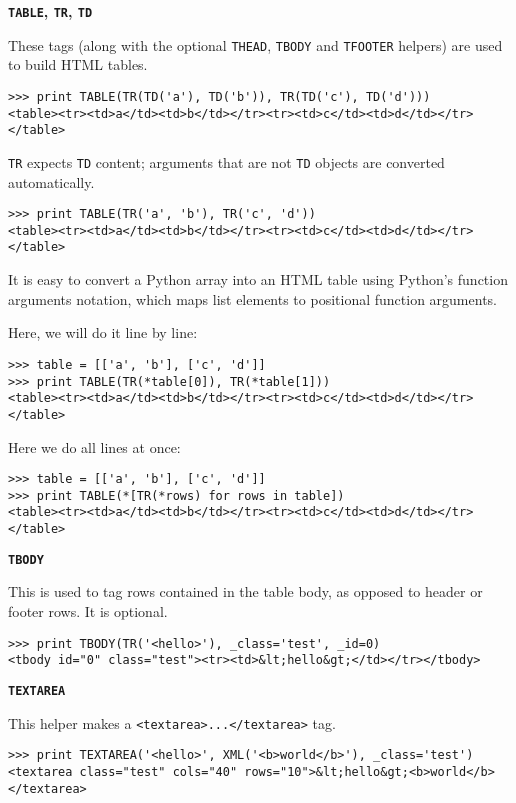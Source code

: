 \documentclass[justified,sixbynine,notoc]{tufte-book}
\def\ft{\small\tt}
\def\inxx#1{\index{#1}}
\begin{document}
\begin{fullwidth}
{\bf {\ft TABLE}, {\ft TR}, {\ft TD}}

\inxx{TABLE} \inxx{TR} \inxx{TD}

These tags (along with the optional {\ft THEAD}, {\ft TBODY} and {\ft TFOOTER} helpers) are used to build HTML tables.
\begin{lstlisting}
>>> print TABLE(TR(TD('a'), TD('b')), TR(TD('c'), TD('d')))
<table><tr><td>a</td><td>b</td></tr><tr><td>c</td><td>d</td></tr></table>
\end{lstlisting}
{\ft TR} expects {\ft TD} content; arguments that are not {\ft TD} objects are converted automatically.
\begin{lstlisting}
>>> print TABLE(TR('a', 'b'), TR('c', 'd'))
<table><tr><td>a</td><td>b</td></tr><tr><td>c</td><td>d</td></tr></table>
\end{lstlisting}

It is easy to convert a Python array into an HTML table using Python's {\ft *} function arguments notation, which maps list elements to positional function arguments.

Here, we will do it line by line:
\begin{lstlisting}
>>> table = [['a', 'b'], ['c', 'd']]
>>> print TABLE(TR(*table[0]), TR(*table[1]))
<table><tr><td>a</td><td>b</td></tr><tr><td>c</td><td>d</td></tr></table>
\end{lstlisting}

Here we do all lines at once:
\begin{lstlisting}
>>> table = [['a', 'b'], ['c', 'd']]
>>> print TABLE(*[TR(*rows) for rows in table])
<table><tr><td>a</td><td>b</td></tr><tr><td>c</td><td>d</td></tr></table>
\end{lstlisting}

{\bf {\ft TBODY}}

\inxx{TBODY}

This is used to tag rows contained in the table body, as opposed to header or footer rows. It is optional.
\begin{lstlisting}
>>> print TBODY(TR('<hello>'), _class='test', _id=0)
<tbody id="0" class="test"><tr><td>&lt;hello&gt;</td></tr></tbody>
\end{lstlisting}

{\bf {\ft TEXTAREA}}

\inxx{TEXTAREA}

This helper makes a {\ft <textarea>...</textarea>} tag.
\begin{lstlisting}
>>> print TEXTAREA('<hello>', XML('<b>world</b>'), _class='test')
<textarea class="test" cols="40" rows="10">&lt;hello&gt;<b>world</b></textarea>
\end{lstlisting}


\end{fullwidth}
\end{document}
